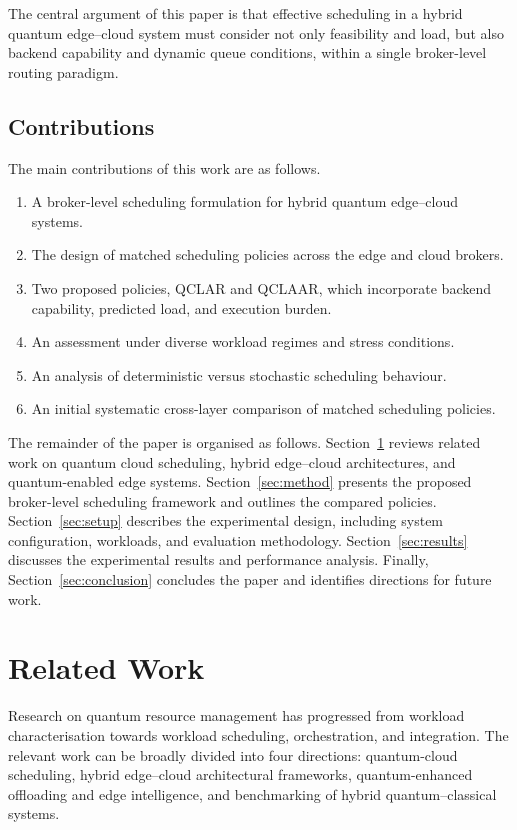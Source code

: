 \documentclass[preprint,12pt]{elsarticle}
\newcommand{\QCLAR}{\textsc{QCLAR}}
\newcommand{\QCLAAR}{\textsc{QCLAAR}}
\begin{document}
The central argument of this paper is that effective scheduling in a hybrid
quantum edge--cloud system must consider not only feasibility and load, but also
backend capability and dynamic queue conditions, within a single broker-level
routing paradigm.

\subsection{Contributions}
The main contributions of this work are as follows.
\begin{enumerate}
  \item A broker-level scheduling formulation for hybrid quantum edge--cloud
        systems.
  \item The design of matched scheduling policies across the edge and cloud
        brokers.
  \item Two proposed policies, \QCLAR{} and \QCLAAR{}, which incorporate backend
        capability, predicted load, and execution burden.
  \item An assessment under diverse workload regimes and stress conditions.
  \item An analysis of deterministic versus stochastic scheduling behaviour.
  \item An initial systematic cross-layer comparison of matched scheduling
        policies.
\end{enumerate}

The remainder of the paper is organised as follows. Section~\ref{sec:related}
reviews related work on quantum cloud scheduling, hybrid edge--cloud
architectures, and quantum-enabled edge systems. Section~\ref{sec:method}
presents the proposed broker-level scheduling framework and outlines the
compared policies. Section~\ref{sec:setup} describes the experimental design,
including system configuration, workloads, and evaluation methodology.
Section~\ref{sec:results} discusses the experimental results and performance
analysis. Finally, Section~\ref{sec:conclusion} concludes the paper and
identifies directions for future work.

\section{Related Work}
\label{sec:related}
Research on quantum resource management has progressed from workload
characterisation towards workload scheduling, orchestration, and integration.
The relevant work can be broadly divided into four directions: quantum-cloud
scheduling, hybrid edge--cloud architectural frameworks, quantum-enhanced
offloading and edge intelligence, and benchmarking of hybrid quantum--classical
systems.
\end{document}
